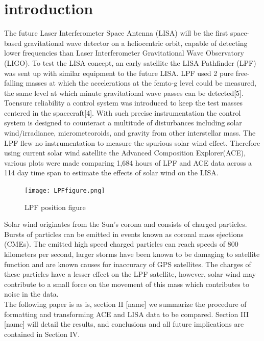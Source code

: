 \documentclass[%
 reprint,
 amsmath,amssymb,
 aps,
]{revtex4-2}
\begin{document}
\section{introduction}
The future Laser Interferometer Space Antenna (LISA) will be the first space-based gravitational wave detector on a heliocentric orbit, capable of detecting lower frequencies than Laser Interferometer Gravitational Wave Observatory (LIGO). To test the LISA concept, an early satellite the LISA Pathfinder (LPF) was sent up with similar equipment to the future LISA. LPF used 2 pure free-falling masses at which the accelerations at the femto-g level could be measured, the same level at which minute gravitational wave passes can be detected[5]. Toensure reliability a control system was introduced to keep the test masses centered in the spacecraft[4]. With such precise instrumentation the control system is designed to counteract a multitude of disturbances including solar wind/irradiance, micrometeoroids, and gravity from other interstellar mass. The LPF flew no instrumentation to measure the spurious solar wind effect. Therefore using current solar wind satellite the Advanced Composition Explorer(ACE), various plots were made comparing 1,684 hours of LPF and ACE data across a 114 day time span to estimate the effects of solar wind on the LISA.\\

\begin{figure}[htbp]
\centerline{\texttt{[image: LPFfigure.png]}}
\caption{LPF position figure}
\label{fig}
\end{figure}

Solar wind originates from the Sun's corona and consists of charged particles. Bursts of particles can be emitted in events known as coronal mass ejections (CMEs). The emitted high speed charged particles can reach speeds of 800 kilometers per second, larger storms have been known to be damaging to satellite function and are known causes for inaccuracy of GPS satellites. The charges of these particles have a lesser effect on the LPF satellite, however, solar wind may contribute to a small force on the movement of this mass which contributes to noise in the data.\\

The following paper is as is, section II [name] we summarize the procedure of formatting and transforming ACE and LISA data to be compared. Section III [name] will detail the results, and conclusions and all future implications are contained in Section IV. \\
\end{document}
